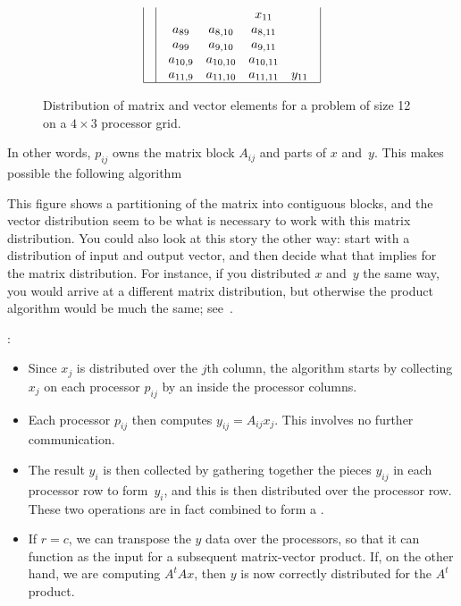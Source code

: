 \begin{figure}[ht]
{\[\begin{array}{| c | c | c | c |}
&
\begin{array}{c c c c}
&&x_{11}\\
a_{89} &   a_{8,10} &  a_{8,11} & \\
a_{99} &   a_{9,10} &  a_{9,11} & \\
a_{10,9} & a_{10,10} & a_{10,11} & \\
a_{11,9} & a_{11,10} & a_{11,11} & y_{11} \\
\end{array}
\\ \hline
\end{array}
\]
}
\caption{Distribution of matrix and vector elements for a problem of size 12 on a $4\times 3$ processor grid.}
\label{fig:2dmatrix}
\end{figure}

In other words, $ p_{ij} $ owns the matrix block $A_{ij}$
and parts of $x$ and~$y$. This makes possible the following algorithm
\begin{footnoteenv}
{This figure shows a partitioning of the matrix into contiguous blocks,
and the vector distribution seem to be what is necessary to work with this 
matrix distribution. You could also look at this story the other way:
start with a distribution of input and output vector, and then decide what
that implies for the matrix distribution. For instance, if you distributed
$x$ and~$y$ the same way, you would arrive at a different matrix distribution,
but otherwise the product algorithm would be much the same;
see~\cite{Flame:PBMD-report}.}
\end{footnoteenv}%
:
\begin{itemize}
\item Since $x_j$ is distributed over the $j$th column, the algorithm starts
  by collecting $x_j$ on each processor $p_{ij}$ by an
   inside the processor columns.
\item Each processor $p_{ij}$ then computes $y_{ij} = A_{ij}x_j$. This
  involves no further communication.
\item The result $y_i$ is then collected by gathering together the
  pieces $y_{ij}$ in each processor row to form~$y_i$, and this is then
  distributed over the processor row. These two operations are in fact
  combined to form a .
\item If $r=c$, we can transpose the $y$ data over the processors, so
  that it can function as the input for a subsequent matrix-vector
  product. If, on the other hand, we are computing $A^tAx$, then $y$
  is now correctly distributed for the $A^t$ product.
\end{itemize}


